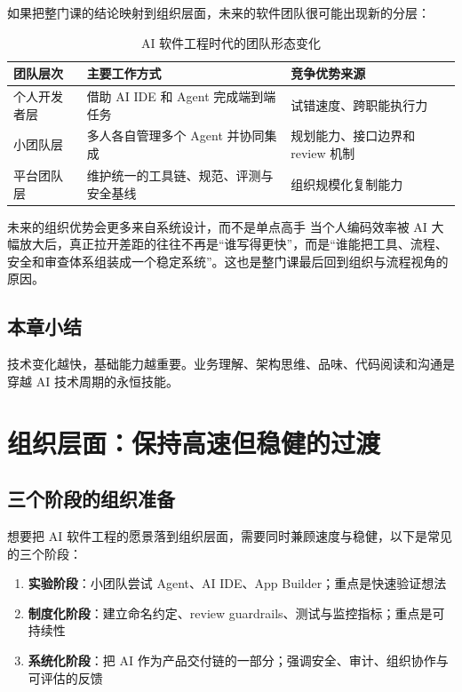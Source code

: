 \documentclass[a4paper]{article}
\begin{document}
如果把整门课的结论映射到组织层面，未来的软件团队很可能出现新的分层：

\begin{table}[H]
\centering
\begin{tabular}{p{} p{} p{}}
\toprule
团队层次 & 主要工作方式 & 竞争优势来源 \\
\midrule
个人开发者层 & 借助 AI IDE 和 Agent 完成端到端任务 & 试错速度、跨职能执行力 \\
小团队层 & 多人各自管理多个 Agent 并协同集成 & 规划能力、接口边界和 review 机制 \\
平台团队层 & 维护统一的工具链、规范、评测与安全基线 & 组织规模化复制能力 \\
\bottomrule
\end{tabular}
\caption{AI 软件工程时代的团队形态变化}
\end{table}

\begin{knowledgebox}{未来的组织优势会更多来自系统设计，而不是单点高手}
当个人编码效率被 AI 大幅放大后，真正拉开差距的往往不再是“谁写得更快”，而是“谁能把工具、流程、安全和审查体系组装成一个稳定系统”。这也是整门课最后回到组织与流程视角的原因。
\end{knowledgebox}

\subsection{本章小结}

技术变化越快，基础能力越重要。业务理解、架构思维、品味、代码阅读和沟通是穿越 AI 技术周期的永恒技能。

\section{组织层面：保持高速但稳健的过渡}

\subsection{三个阶段的组织准备}

想要把 AI 软件工程的愿景落到组织层面，需要同时兼顾速度与稳健，以下是常见的三个阶段：

\begin{enumerate}
    \item \textbf{实验阶段}：小团队尝试 Agent、AI IDE、App Builder；重点是快速验证想法
    \item \textbf{制度化阶段}：建立命名约定、review guardrails、测试与监控指标；重点是可持续性
    \item \textbf{系统化阶段}：把 AI 作为产品交付链的一部分；强调安全、审计、组织协作与可评估的反馈
\end{enumerate}
\end{document}
